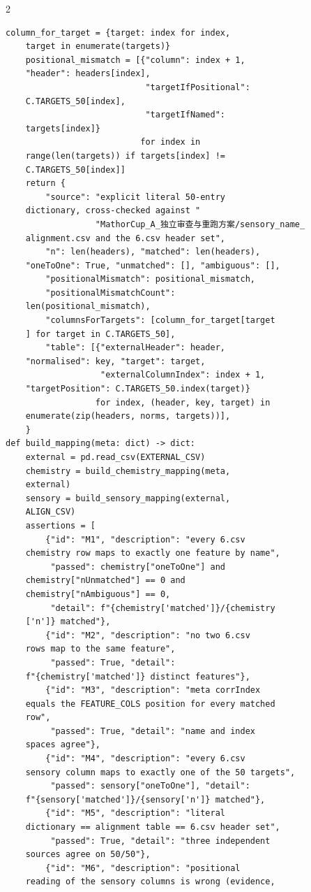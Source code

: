 \begin{multicols}{2}
\begin{Verbatim}[fontsize=\scriptsize]
    column_for_target = {target: index for index,
    target in enumerate(targets)}
    positional_mismatch = [{"column": index + 1,
    "header": headers[index],
                            "targetIfPositional":
    C.TARGETS_50[index],
                            "targetIfNamed":
    targets[index]}
                           for index in
    range(len(targets)) if targets[index] !=
    C.TARGETS_50[index]]
    return {
        "source": "explicit literal 50-entry
    dictionary, cross-checked against "
                  "MathorCup_A_独立审查与重跑方案/sensory_name_
    alignment.csv and the 6.csv header set",
        "n": len(headers), "matched": len(headers),
    "oneToOne": True, "unmatched": [], "ambiguous": [],
        "positionalMismatch": positional_mismatch,
        "positionalMismatchCount":
    len(positional_mismatch),
        "columnsForTargets": [column_for_target[target
    ] for target in C.TARGETS_50],
        "table": [{"externalHeader": header,
    "normalised": key, "target": target,
                   "externalColumnIndex": index + 1,
    "targetPosition": C.TARGETS_50.index(target)}
                  for index, (header, key, target) in
    enumerate(zip(headers, norms, targets))],
    }
def build_mapping(meta: dict) -> dict:
    external = pd.read_csv(EXTERNAL_CSV)
    chemistry = build_chemistry_mapping(meta,
    external)
    sensory = build_sensory_mapping(external,
    ALIGN_CSV)
    assertions = [
        {"id": "M1", "description": "every 6.csv
    chemistry row maps to exactly one feature by name",
         "passed": chemistry["oneToOne"] and
    chemistry["nUnmatched"] == 0 and
    chemistry["nAmbiguous"] == 0,
         "detail": f"{chemistry['matched']}/{chemistry
    ['n']} matched"},
        {"id": "M2", "description": "no two 6.csv
    rows map to the same feature",
         "passed": True, "detail":
    f"{chemistry['matched']} distinct features"},
        {"id": "M3", "description": "meta corrIndex
    equals the FEATURE_COLS position for every matched
    row",
         "passed": True, "detail": "name and index
    spaces agree"},
        {"id": "M4", "description": "every 6.csv
    sensory column maps to exactly one of the 50 targets",
         "passed": sensory["oneToOne"], "detail":
    f"{sensory['matched']}/{sensory['n']} matched"},
        {"id": "M5", "description": "literal
    dictionary == alignment table == 6.csv header set",
         "passed": True, "detail": "three independent
    sources agree on 50/50"},
        {"id": "M6", "description": "positional
    reading of the sensory columns is wrong (evidence,

\end{Verbatim}
\end{multicols}
